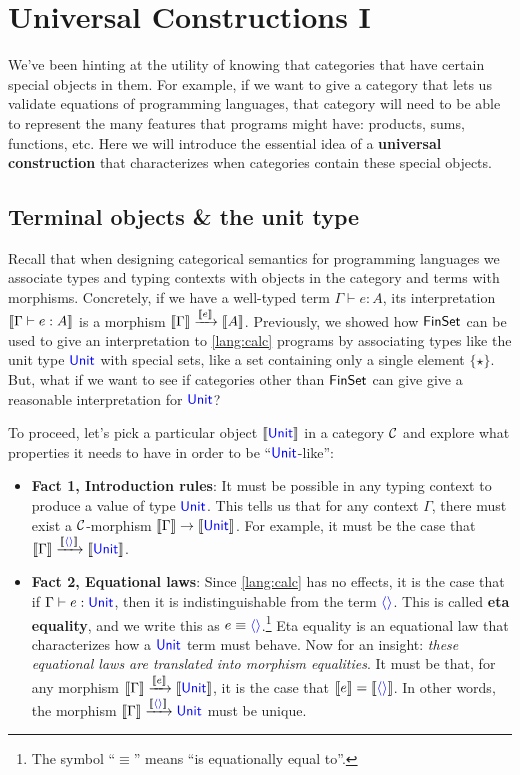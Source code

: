 \chapter{Universal Constructions I}
We've been hinting at the utility of knowing that categories that have certain
special objects in them. For example, if we want to give a category that lets us
validate equations of programming languages, that category will need to be able 
to represent the many features that programs might have: products, sums, 
functions, etc. Here we will introduce the essential idea of a \textbf{universal 
construction} that characterizes when categories contain these special objects.

\section{Terminal objects \& the unit type}
Recall that when designing categorical semantics for programming languages we
associate types and typing contexts with objects in the category and terms with
morphisms. Concretely, if we have a well-typed term $\Gamma \vdash e : A$,
its interpretation $\left\llbracket \Gamma \vdash e : A \right\rrbracket$ is a morphism
$\left\llbracket \Gamma \right\rrbracket \xrightarrow{\left\llbracket e \right\rrbracket} \left\llbracket A \right\rrbracket$.
Previously, we showed how \(\mathsf{FinSet}\) can be used to give an interpretation 
to \ref{lang:calc} programs by associating types like the unit type $\mathsf{{\color{blue}Unit}}$
with special sets, like a set containing only a single element $\{\star\}$.
But, what if we want to see if categories other than $\mathsf{FinSet}$ can give give a 
reasonable interpretation for $\mathsf{{\color{blue}Unit}}$?

To proceed, let's pick a particular object $\left\llbracket \mathsf{{\color{blue}Unit}} \right\rrbracket$ 
in a category $\mathcal C$ and explore what properties it needs to have in order 
to be ``$\mathsf{{\color{blue}Unit}}$-like'':
\begin{itemize}
  \item \textbf{Fact 1, Introduction rules}: It must be possible in any typing context to
  produce a value of type $\mathsf{{\color{blue}Unit}}$.  This tells us that for any context
  $\Gamma$, there must exist a $\mathcal C$-morphism
  $\left\llbracket \Gamma \right\rrbracket \to \left\llbracket \mathsf{{\color{blue}Unit}} \right\rrbracket$.
  For example, it must 
  be the case that 
  $\left\llbracket \Gamma \right\rrbracket \xrightarrow{\left\llbracket {{\color{blue}\langle \rangle}} \right\rrbracket} \left\llbracket \mathsf{{\color{blue}Unit}} \right\rrbracket$.

  \item \textbf{Fact 2, Equational laws}: Since \ref{lang:calc} has no effects, 
  it is the case that if $\Gamma \vdash e : \mathsf{{\color{blue}Unit}}$, then it is indistinguishable 
  from the term ${{\color{blue}\langle \rangle}}$. This is called \textbf{eta equality}, and we write
  this as $e \equiv {{\color{blue}\langle \rangle}}$.\footnote{The symbol ``$\equiv$'' means ``is
  equationally equal to''.} Eta equality is an equational law that characterizes
  how a $\mathsf{{\color{blue}Unit}}$ term must behave. Now for an insight: \emph{these equational
  laws are translated into morphism equalities}. It must be that, for any
  morphism $\left\llbracket \Gamma \right\rrbracket \xrightarrow{\left\llbracket e \right\rrbracket} \left\llbracket \mathsf{{\color{blue}Unit}} \right\rrbracket$, it
  is the case that $\left\llbracket e \right\rrbracket = \left\llbracket {{\color{blue}\langle \rangle}} \right\rrbracket$.  In other words, the
  morphism $\left\llbracket \Gamma \right\rrbracket \xrightarrow{\left\llbracket {{\color{blue}\langle \rangle}} \right\rrbracket} \mathsf{{\color{blue}Unit}}$ must be
  unique.
\end{itemize}

